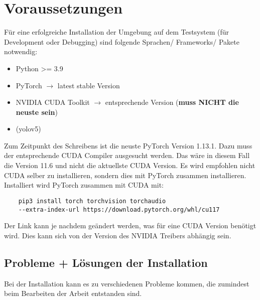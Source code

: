 \chapter{Voraussetzungen}

Für eine erfolgreiche Installation der Umgebung auf dem Testsystem (für Development oder Debugging) sind folgende Sprachen/ Frameworks/ Pakete notwendig:
\begin{itemize}
    \item Python >= 3.9
    \item PyTorch $\rightarrow$ latest stable Version
    \item NVIDIA CUDA Toolkit $\rightarrow$ entsprechende Version (\textbf{muss NICHT die neuste sein})
    \item (yolov5)
\end{itemize}

Zum Zeitpunkt des Schreibens ist die neuste PyTorch Version 1.13.1. Dazu muss der entsprechende CUDA Compiler ausgesucht werden. Das wäre in diesem Fall die Version 11.6 und nicht die aktuellste CUDA Version. Es wird empfohlen nicht CUDA selber zu installieren, sondern dies mit PyTorch zusammen installieren. Installiert wird PyTorch zusammen mit CUDA mit:
\begin{verbatim}
    pip3 install torch torchvision torchaudio 
    --extra-index-url https://download.pytorch.org/whl/cu117
\end{verbatim}
Der Link kann je nachdem geändert werden, was für eine CUDA Version benötigt wird. Dies kann sich von der Version des NVIDIA Treibers abhängig sein.
\section{Probleme + Lösungen der Installation}

Bei der Installation kann es zu verschiedenen Probleme kommen, die zumindest beim Bearbeiten der Arbeit entstanden sind.